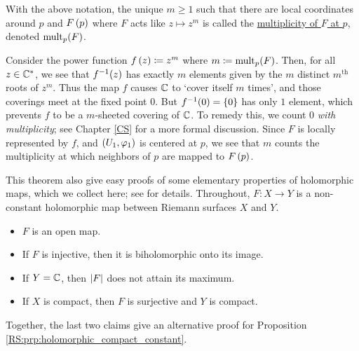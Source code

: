\documentclass[../Moduli_Spaces_of_Riemann_Surfaces.tex]{subfiles}
\begin{document}
    \begin{definition}
        With the above notation, the unique $m\geq1$ such that there are local coordinates around $p$ and $F\left(p\right)$ where $F$ acts like $z\mapsto z^m$ is called the \ul{multiplicity of $F$ at $p$}, denoted $\operatorname{mult}_p\!\left(F\right)$.
    \end{definition}
    \begin{remark}
        Consider the power function $f\left(z\right)\coloneqq z^m$ where $m\coloneqq\operatorname{mult}_p\!\left(F\right)$. Then, for all $z\in\mathbb{C}^*$, we see that $f^{-1}\!\left(z\right)$ has exactly $m$ elements given by the $m$ distinct $m^\textrm{th}$ roots of $z^m$. Thus the map $f$ causes $\mathbb{C}$ to `cover itself $m$ times', and those coverings meet at the fixed point $0$. But $f^{-1}\!\left(0\right)=\left\{0\right\}$ has only $1$ element, which prevents $f$ to be a $m$-sheeted covering of $\mathbb{C}$. To remedy this, we count $0$ \textit{with multiplicity}; see Chapter \ref{CS} for a more formal discussion. Since $F$ is locally represented by $f$, and $\left(U_1,\varphi_1\right)$ is centered at $p$, we see that $m$ counts the multiplicity at which neighbors of $p$ are mapped to $F\left(p\right)$.\exqed
    \end{remark}
    \begin{remark}
        This theorem also give easy proofs of some elementary properties of holomorphic maps, which we collect here; see \cite[][Section 1.2]{forster} for details. Throughout, $F:X\to Y$ is a non-constant holomorphic map between Riemann surfaces $X$ and $Y$.
        \begin{itemize}
            \item $F$ is an open map.
                \vspace{-0.05in}
            \item If $F$ is injective, then it is biholomorphic onto its image.
                \vspace{-0.05in}
            \item If $Y=\mathbb{C}$, then $\left|F\right|$ does not attain its maximum.
                \vspace{-0.05in}
            \item If $X$ is compact, then $F$ is surjective and $Y$ is compact.
        \end{itemize}
        Together, the last two claims give an alternative proof for Proposition \ref{RS:prp:holomorphic_compact_constant}.\exqed
    \end{remark}
\end{document}
